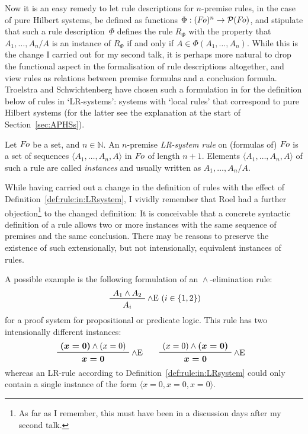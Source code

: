 \documentclass[envcountsame,runningheads]{llncs}
\newcommand{\seqlft}{{\langle}}
\newcommand{\seqrgt}{{\rangle}}
\newcommand{\seq}[1]{\seqlft#1\seqrgt}
\newcommand{\nat}{\mathbb N}
\newcommand{\sfunin}{{:}}
\newcommand{\funin}{\mathrel{\sfunin}}
\newcommand{\spowerset}{\mcl{P}}
\newcommand{\powerset}{\funap{\spowerset}}
\newcommand{\sub}[2]{#1_{#2}}
\newcommand{\funap}[2]{#1(#2)}
\newcommand{\indap}[2]{{\sub{#1}{#2}}}
\newcommand{\forms}{{\mit F\hspace*{-1.1pt}o}}
\newcommand{\bs}{\boldsymbol}
\newcommand{\mcl}{\mathcal}
\newcommand{\saruledes}{\Phi}
\newcommand{\aruledes}{\funap{\Phi}}
\newcommand{\srule}{R}
\newcommand{\rulei}{\indap{\srule}}
\newcommand{\slogand}{{\wedge}}
\newcommand{\logand}{\mathrel{\slogand}}
\newcommand{\sAndElim}{{\slogand\text{E}}}
\begin{document}
Now it is an easy remedy to let rule descriptions for $n$-premise rules,
in the case of pure Hilbert systems, be defined as functions
$\saruledes \funin (\forms)^n \rightarrow \powerset{\forms}$,
and stipulate that such a rule description~$\saruledes$ 
defines the rule $\rulei{\saruledes}$  with the property
that $ A_1,\ldots,A_n / A $ is an instance of $\rulei{\saruledes}$
if and only if $A\in \aruledes{A_1,\ldots,A_n}$. 
While this is the change I carried out for my second talk,
it is perhaps more natural to drop the functional aspect in 
the formalisation of rule descriptions altogether,
and view rules as relations between premise formulas and a
conclusion formula.
Troelstra and Schwichtenberg have chosen such a formulation 
in \cite{troe:schw:2000} for the definition below of
rules in `LR-systems': systems
with `local rules' that correspond to pure Hilbert systems
(for the latter see the explanation at the start of Section~\ref{sec:APHSs}).



\begin{definition}\normalfont
  \label{def:rule:in:LRsystem}
Let $\forms$ be a set, and $n\in\nat$.
  An $n$-premise \emph{LR-system rule} on (formulas of) $\forms$
  is a set of sequences $\seq{A_1,\ldots,A_n,A}$ in $\forms$ 
  of length $n+1$. Elements $\seq{A_1,\ldots,A_n,A}$ of
  such a rule are called \emph{instances} and usually written
  as $A_1,\ldots,A_n/A$. 
\end{definition}


While having carried out a change in the definition of rules
with the effect of Definition~\ref{def:rule:in:LRsystem},
I vividly remember that Roel had a further objection\footnote{As far as I remember, this must have been in
    a discussion days after my second talk.}
to the changed definition: 
It is conceivable that a concrete syntactic definition of
a rule allows two or more instances with the same sequence of
premises and the same conclusion. There may be reasons
to preserve the existence of such extensionally,
but not intensionally, equivalent instances of rules. 

A possible example is the following formulation of an
$\logand$-elimination rule:
\begin{equation*}
\mbox{ 
        \AxiomC{$ A_1 \wedge A_2 $}
        \RightLabel{$\wedge$E $(i\in\{1,2\})$}
        \UnaryInfC{$ \rule{0pt}{2ex} A_i $}
        \DisplayProof
          }
\end{equation*}
for a proof system for propositional or predicate logic. 
This rule has two intensionally different instances:
\begin{align*}
&
     \mbox{ 
        \AxiomC{$ \bs{(x=0)} \wedge (x=0) $}
        \RightLabel{$\sAndElim$}
        \UnaryInfC{$ \rule{0pt}{2ex} \bs{x=0} $}
           \DisplayProof
           }
     & &
     \mbox{
        \AxiomC{$ (x=0) \wedge \bs{(x=0)} $}
        \RightLabel{$\sAndElim$}
        \UnaryInfC{$ \rule{0pt}{2ex} \bs{x=0} $}
        \DisplayProof
           }
\end{align*}
whereas an LR-rule according to Definition~\ref{def:rule:in:LRsystem}
could only contain a single instance of the form
$\seq{x=0,x=0,x=0}$.
\end{document}

